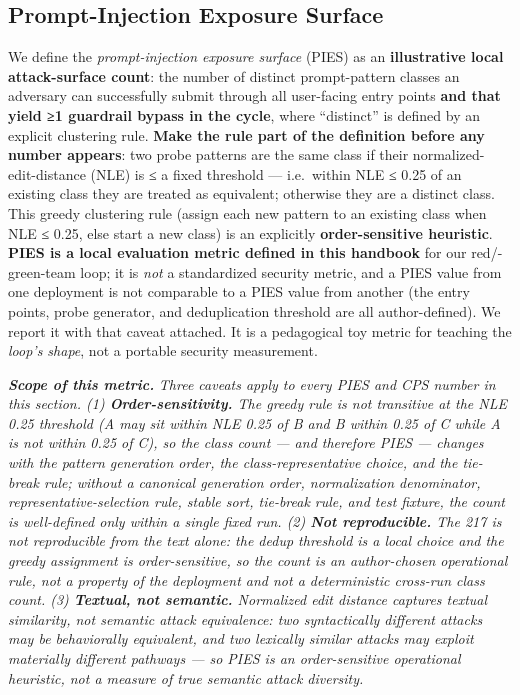 
\label{worked-example}


\subsection{Prompt-Injection Exposure
Surface}\label{prompt-injection-exposure-surface}

We define the \emph{prompt-injection exposure surface} (PIES) as an
\textbf{illustrative local attack-surface count}: the number of distinct
prompt-pattern classes an adversary can successfully submit through all
user-facing entry points \textbf{and that yield ≥1 guardrail bypass in
the cycle}, where ``distinct'' is defined by an explicit clustering
rule. \textbf{Make the rule part of the definition before any number
appears}: two probe patterns are the same class if their
normalized-edit-distance (NLE) is ≤ a fixed threshold --- i.e.~within
NLE ≤ 0.25 of an existing class they are treated as equivalent;
otherwise they are a distinct class. This greedy clustering rule (assign
each new pattern to an existing class when NLE ≤ 0.25, else start a new
class) is an explicitly \textbf{order-sensitive heuristic}. \textbf{PIES
is a local evaluation metric defined in this handbook} for our
red/-green-team loop; it is \emph{not} a standardized security metric,
and a PIES value from one deployment is not comparable to a PIES value
from another (the entry points, probe generator, and deduplication
threshold are all author-defined). We report it with that caveat
attached. It is a pedagogical toy metric for teaching the \emph{loop's
shape}, not a portable security measurement.

\textbf{\emph{Scope of this metric.}} \emph{Three caveats apply to every
PIES and CPS number in this section. (1) \textbf{Order-sensitivity.} The
greedy rule is not transitive at the NLE 0.25 threshold (A may sit
within NLE 0.25 of B and B within 0.25 of C while A is not within 0.25
of C), so the class count --- and therefore PIES --- changes with the
pattern generation order, the class-representative choice, and the
tie-break rule; without a canonical generation order, normalization
denominator, representative-selection rule, stable sort, tie-break rule,
and test fixture, the count is well-defined only within a single fixed
run. (2) \textbf{Not reproducible.} The 217 is not reproducible from the
text alone: the dedup threshold is a local choice and the greedy
assignment is order-sensitive, so the count is an author-chosen
operational rule, not a property of the deployment and not a
deterministic cross-run class count. (3) \textbf{Textual, not semantic.}
Normalized edit distance captures textual similarity, not semantic
attack equivalence: two syntactically different attacks may be
behaviorally equivalent, and two lexically similar attacks may exploit
materially different pathways --- so PIES is an order-sensitive
operational heuristic, not a measure of true semantic attack diversity.}

